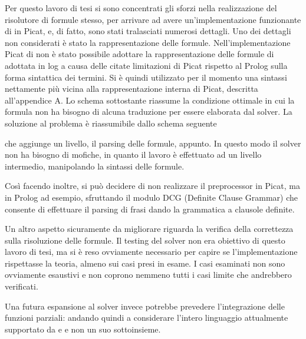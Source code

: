 \documentclass[12pt,a4paper,openright]{book}  %
\begin{document}
Per questo lavoro di tesi si sono concentrati gli sforzi nella
realizzazione del risolutore di formule stesso, per arrivare ad avere
un’implementazione funzionante di \lset{} in Picat, e, di fatto, sono
stati tralasciati numerosi dettagli.  Uno dei dettagli non considerati
è stato la rappresentazione delle formule. Nell’implementazione Picat
di \lset{} non è stato possibile adottare la rappresentazione delle
formule di \lset{} adottata in {log} a causa delle citate limitazioni
di Picat rispetto al Prolog sulla forma sintattica dei termini. Si è
quindi utilizzato per il momento una sintassi nettamente più vicina
alla rappresentazione interna di Picat, descritta all’appendice A. Lo
schema sottostante riassume la condizione ottimale in cui la formula
non ha bisogno di alcuna traduzione per essere elaborata dal
solver. La soluzione al problema è riassumibile dallo schema seguente
\begin{figure}[H]
	\centering
\end{figure}
che aggiunge un livello, il parsing delle formule, appunto. In questo
modo il solver non ha bisogno di mofiche, in quanto il lavoro è
effettuato ad un livello intermedio, manipolando la sintassi delle
formule.

Così facendo inoltre, si può decidere di non realizzare il
preprocessor in Picat, ma in Prolog ad esempio, sfruttando il modulo
DCG \cite{MetalevelDCG} (Definite Clause Grammar) che consente di
effettuare il parsing di frasi dando la grammatica a clausole
definite.

Un altro aspetto sicuramente da migliorare riguarda la verifica della
correttezza sulla risoluzione delle formule. Il testing del solver non
era obiettivo di questo lavoro di tesi, ma si è reso ovviamente
necessario per capire se l'implementazione rispettasse la teoria,
almeno sui casi presi in esame. I casi esaminati non sono ovviamente
esaustivi e non coprono nemmeno tutti i casi limite che andrebbero
verificati.

Una futura espansione al solver invece potrebbe prevedere
l'integrazione delle funzioni parziali: andando quindi a considerare
l'intero linguaggio attualmente supportato da \setlog{} e \jsetl{} e
non un suo sottoinsieme.
\end{document}
